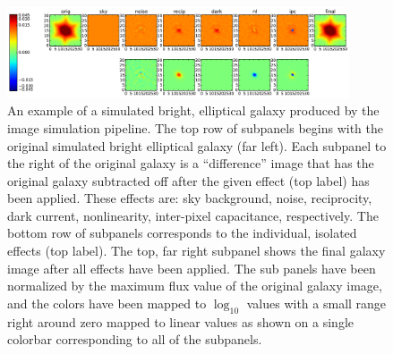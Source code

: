 \begin{figure}[!t]
  \includegraphics[width=0.9\textwidth]{Plots/wfirst_wl_imsim_example.pdf}
\caption{\label{fig:wl_imsim} An example of a simulated bright, elliptical galaxy produced by the image simulation pipeline.  The top row of subpanels begins with the original simulated bright elliptical galaxy (far left).  Each subpanel to the right of the original galaxy is a ``difference'' image that has the original galaxy subtracted off after the given effect (top label) has been applied.  These effects are: sky background, noise, reciprocity, dark current, nonlinearity, inter-pixel capacitance, respectively.  The bottom row of subpanels corresponds to the individual, isolated effects (top label).  The top, far right subpanel shows the final galaxy image after all effects have been applied.  The sub panels have been normalized by the maximum flux value of the original galaxy image, and the colors have been mapped to $\log_{10}$ values with a small range right around zero mapped to linear values as shown on a single colorbar corresponding to all of the subpanels.}
\end{figure}

